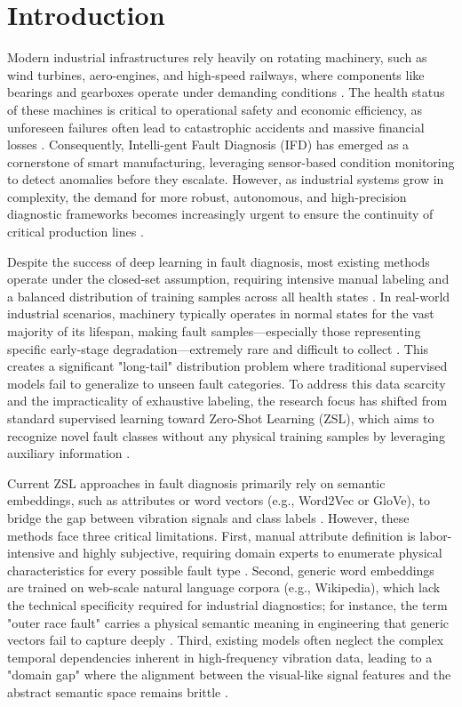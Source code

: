 \section{Introduction}
Modern industrial infrastructures rely heavily on rotating machinery, such as wind turbines, aero-engines, and high-speed railways, where components like bearings and gearboxes operate under demanding conditions \cite{zhai2021multi}. The health status of these machines is critical to operational safety and economic efficiency, as unforeseen failures often lead to catastrophic accidents and massive financial losses \cite{lei2020applications}. Consequently, Intelli-gent Fault Diagnosis (IFD) has emerged as a cornerstone of smart manufacturing, leveraging sensor-based condition monitoring to detect anomalies before they escalate. However, as industrial systems grow in complexity, the demand for more robust, autonomous, and high-precision diagnostic frameworks becomes increasingly urgent to ensure the continuity of critical production lines \cite{li2020deep}.

Despite the success of deep learning in fault diagnosis, most existing methods operate under the closed-set assumption, requiring intensive manual labeling and a balanced distribution of training samples across all health states \cite{zhang2022digital}. In real-world industrial scenarios, machinery typically operates in normal states for the vast majority of its lifespan, making fault samples—especially those representing specific early-stage degradation—extremely rare and difficult to collect \cite{liu2018zero}. This creates a significant "long-tail" distribution problem where traditional supervised models fail to generalize to unseen fault categories. To address this data scarcity and the impracticality of exhaustive labeling, the research focus has shifted from standard supervised learning toward Zero-Shot Learning (ZSL), which aims to recognize novel fault classes without any physical training samples by leveraging auxiliary information \cite{wang2019zero, socher2013zero}.

Current ZSL approaches in fault diagnosis primarily rely on semantic embeddings, such as attributes or word vectors (e.g., Word2Vec or GloVe), to bridge the gap between vibration signals and class labels \cite{lampert2014attribute}. However, these methods face three critical limitations. First, manual attribute definition is labor-intensive and highly subjective, requiring domain experts to enumerate physical characteristics for every possible fault type \cite{fu2018zero}. Second, generic word embeddings are trained on web-scale natural language corpora (e.g., Wikipedia), which lack the technical specificity required for industrial diagnostics; for instance, the term "outer race fault" carries a physical semantic meaning in engineering that generic vectors fail to capture deeply \cite{mikolov2013efficient}. Third, existing models often neglect the complex temporal dependencies inherent in high-frequency vibration data, leading to a "domain gap" where the alignment between the visual-like signal features and the abstract semantic space remains brittle \cite{xian2018zero, buchert2020zero}.

